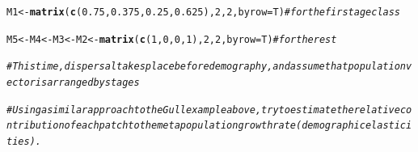 \documentclass{article}\usepackage[]{graphicx}\usepackage[]{color}
\makeatletter
\newcommand{\hlnum}[1]{\textcolor[rgb]{0.686,0.059,0.569}{#1}}%
\newcommand{\hlcom}[1]{\textcolor[rgb]{0.678,0.584,0.686}{\textit{#1}}}%
\newcommand{\hlstd}[1]{\textcolor[rgb]{0.345,0.345,0.345}{#1}}%
\newcommand{\hlkwb}[1]{\textcolor[rgb]{0.69,0.353,0.396}{#1}}%
\newcommand{\hlkwc}[1]{\textcolor[rgb]{0.333,0.667,0.333}{#1}}%
\newcommand{\hlkwd}[1]{\textcolor[rgb]{0.737,0.353,0.396}{\textbf{#1}}}%
\newenvironment{kframe}{%
 \def\at@end@of@kframe{}%
 \ifinner\ifhmode%
  \def\at@end@of@kframe{\end{minipage}}%
  \begin{minipage}{\columnwidth}%
 \fi\fi%
 \def\FrameCommand##1{\hskip\@totalleftmargin \hskip-\fboxsep
 \colorbox{shadecolor}{##1}\hskip-\fboxsep
     \hskip-\linewidth \hskip-\@totalleftmargin \hskip\columnwidth}%
 \MakeFramed {\advance\hsize-\width
   \@totalleftmargin\z@ \linewidth\hsize
   \@setminipage}}%
 {\par\unskip\endMakeFramed%
 \at@end@of@kframe}
\newenvironment{knitrout}{}{} %
\makeatother
\begin{document}
\begin{knitrout}
\begin{kframe}
\begin{alltt}
\hlstd{M1}\hlkwb{<-}\hlkwd{matrix}\hlstd{(}\hlkwd{c}\hlstd{(}\hlnum{0.75}\hlstd{,}\hlnum{0.375}\hlstd{,}\hlnum{0.25}\hlstd{,}\hlnum{0.625}\hlstd{),}\hlnum{2}\hlstd{,}\hlnum{2}\hlstd{,}\hlkwc{byrow}\hlstd{=T)}  \hlcom{# for the first age class}

\hlstd{M5}\hlkwb{<-}\hlstd{M4}\hlkwb{<-}\hlstd{M3}\hlkwb{<-}\hlstd{M2}\hlkwb{<-}\hlkwd{matrix}\hlstd{(}\hlkwd{c}\hlstd{(}\hlnum{1}\hlstd{,}\hlnum{0}\hlstd{,}\hlnum{0}\hlstd{,}\hlnum{1}\hlstd{),}\hlnum{2}\hlstd{,}\hlnum{2}\hlstd{,}\hlkwc{byrow}\hlstd{=T)} \hlcom{# for the rest}


\hlcom{# This time, dispersal takes place before demography, and assume that population vector is arranged by stages}

\hlcom{# Using a similar approach to the Gull example above, try to estimate the relative contribution of each patch to the metapopulation growth rate (demographic elasticities).}
\end{alltt}
\end{kframe}
\end{knitrout}
\end{document}
